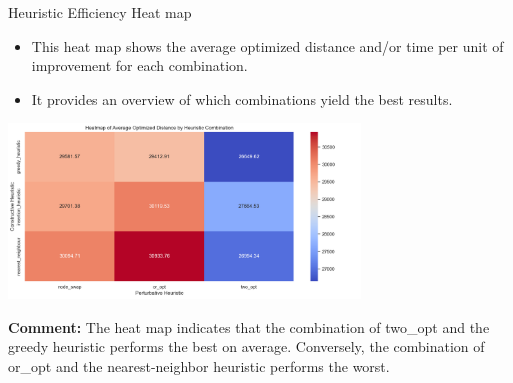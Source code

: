 \documentclass[presentation]{beamer}
\begin{document}
\begin{frame}{Heuristic Efficiency Heat map}
\begin{itemize}
    \item This heat map shows the average optimized distance and/or time per unit of improvement for each combination.
    \item It provides an overview of which combinations yield the best results.
\end{itemize}
\begin{center}
\includegraphics[width=0.7\textwidth]{heatmap.png}\\
\end{center}
\textbf{Comment:} The heat map indicates that the combination of two\_opt and the greedy heuristic performs the best on average. Conversely, the combination of or\_opt and the nearest-neighbor heuristic performs the worst.
\end{frame}
\end{document}
